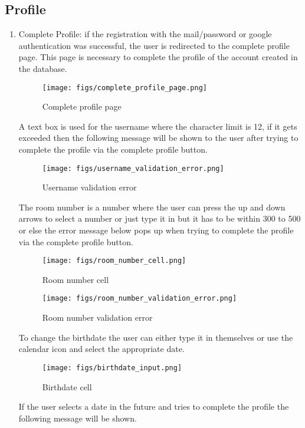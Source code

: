 \documentclass[conference]{IEEEtran}
\begin{document}
\subsection{Profile}
\begin{enumerate}
    \item Complete Profile: if the registration with the mail/password or google authentication was successful, the user is redirected to the complete profile page. This page is necessary to complete the profile of the account created in the database.
    \begin{figure}[H]
    \centering
    \texttt{[image: figs/complete\_profile\_page.png]}
    \caption{Complete profile page}
    \label{fig:Complete profile page}
    \end{figure}
    A text box is used for the username where the character limit is 12, if it gets exceeded then the following message will be shown to the user after trying to complete the profile via the complete profile button.
    \begin{figure}[H]
    \centering
    \texttt{[image: figs/username\_validation\_error.png]}
    \caption{Username validation error}
    \label{fig:Username validation error}
    \end{figure}
    The room number is a number where the user can press the up and down arrows to select a number or just type it in but it has to be within 300 to 500 or else the error message below pops up when trying to complete the profile via the complete profile button.
    \begin{figure}[H]
    \centering
    \texttt{[image: figs/room\_number\_cell.png]}
    \caption{Room number cell}
    \label{fig:Room number cell}
    \end{figure}
    \begin{figure}[H]
    \centering
    \texttt{[image: figs/room\_number\_validation\_error.png]}
    \caption{Room number validation error}
    \label{fig:Room number validation error}
    \end{figure}
    To change the birthdate the user can either type it in themselves or use the calendar icon and select the appropriate date.
    \begin{figure}[H]
    \centering
    \texttt{[image: figs/birthdate\_input.png]}
    \caption{Birthdate cell}
    \label{fig:Birthdate cell}
    \end{figure}
    If the user selects a date in the future and tries to complete the profile the following message will be shown.

\end{enumerate}
\end{document}
